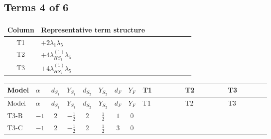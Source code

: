 \documentclass[8pt]{article}
\begin{document}
\begin{landscape}
\subsection*{Terms 4 of 6}
\begin{center}
\begin{tabular}{@{}c >{\raggedright\arraybackslash}p{0.82\linewidth}@{}}
\toprule
Column & Representative term structure \\
\midrule
T1 & \(\displaystyle +2 {\lambda_1} {\lambda_5}\) \\
\midrule
T2 & \(\displaystyle +4 {\lambda_{HS_1}^{(1)}} {\lambda_5}\) \\
\midrule
T3 & \(\displaystyle +4 {\lambda_{HS_2}^{(1)}} {\lambda_5}\) \\
\midrule
\bottomrule
\end{tabular}
\end{center}
\smallskip
\tiny
\begin{longtable}{@{}llcccccc >{\raggedright\arraybackslash}p{0.21\linewidth} >{\raggedright\arraybackslash}p{0.21\linewidth} >{\raggedright\arraybackslash}p{0.21\linewidth}@{}}
\toprule
Model & $\alpha$ & $d_{S_1}$ & $Y_{S_1}$ & $d_{S_2}$ & $Y_{S_2}$ & $d_F$ & $Y_F$ & T1 & T2 & T3 \\
\midrule
\endfirsthead
\toprule
Model & $\alpha$ & $d_{S_1}$ & $Y_{S_1}$ & $d_{S_2}$ & $Y_{S_2}$ & $d_F$ & $Y_F$ & T1 & T2 & T3 \\
\midrule
\endhead
T3-B & $-1$ & $2$ & $-\frac{1}{2}$ & $2$ & $\frac{1}{2}$ & $1$ & $0$ & \scriptsize\adjustbox{max width=\linewidth}{$\begin{gathered} +2 {\lambda_1} {\lambda_5}\end{gathered}$} & \scriptsize\adjustbox{max width=\linewidth}{$\begin{gathered} +4 {\lambda_{HS_1}^{(1)}} {\lambda_5}\end{gathered}$} & \scriptsize\adjustbox{max width=\linewidth}{$\begin{gathered} +4 {\lambda_{HS_2}^{(1)}} {\lambda_5}\end{gathered}$} \\
\midrule
T3-C & $-1$ & $2$ & $-\frac{1}{2}$ & $2$ & $\frac{1}{2}$ & $3$ & $0$ & \scriptsize\adjustbox{max width=\linewidth}{$\begin{gathered} +2 {\lambda_1} {\lambda_5}\end{gathered}$} & \scriptsize\adjustbox{max width=\linewidth}{$\begin{gathered} +4 {\lambda_{HS_1}^{(1)}} {\lambda_5}\end{gathered}$} & \scriptsize\adjustbox{max width=\linewidth}{$\begin{gathered} +4 {\lambda_{HS_2}^{(1)}} {\lambda_5}\end{gathered}$} \\

\end{longtable}
\end{landscape}
\end{document}
